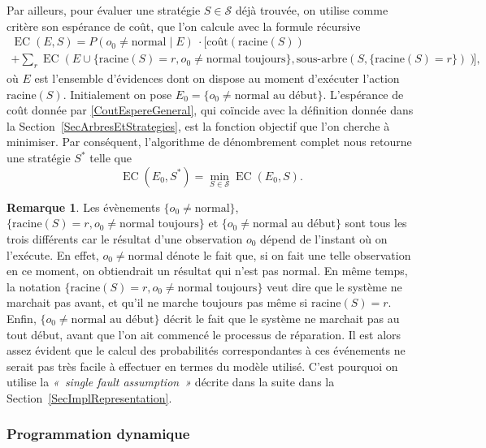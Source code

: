 \documentclass[a4paper,11pt]{article}
\theoremstyle{plain}
\theoremstyle{definition}
\newtheorem*{remk}{Remarque}
\DeclareMathOperator{\EC}{EC}
\begin{document}
Par ailleurs, pour évaluer une stratégie $S \in \mathcal S$ déjà trouvée, on utilise comme critère son espérance de coût, que l'on calcule avec la formule récursive
\begin{multline}
\label{CoutEspereGeneral}
\EC(E, S) = P(o_0 \neq \text{normal} \mid E) \: \cdot \Biggl[\text{coût}(\text{racine}(S)) \\ + \sum_{r} \EC(E \cup \{\text{racine}(S) = r, o_0 \neq \text{normal toujours}\}, \text{sous-arbre}(S, \{\text{racine}(S) = r\}))\Biggr],
\end{multline}
où $E$ est l'ensemble d'évidences dont on dispose au moment d'exécuter l'action $\text{racine}(S)$. Initialement on pose $E_0 = \{o_0 \neq \text{normal au début}\}$. L'espérance de coût donnée par \eqref{CoutEspereGeneral}, qui coïncide avec la définition donnée dans la Section~\ref{SecArbresEtStrategies}, est la fonction objectif que l'on cherche à minimiser. Par conséquent, l'algorithme de dénombrement complet nous retourne une stratégie $S^*$ telle que
\begin{equation}
\label{SolMainProblem}
\EC(E_0, S^*) = \min_{S \in \mathcal S} {\EC(E_0, S)}.
\end{equation}

\begin{remk}
Les évènements $\{o_0 \neq \text{normal}\}$, $\{\text{racine}(S) = r, o_0 \neq \text{normal toujours}\}$ et $\{o_0 \neq \text{normal }\allowbreak\text{au }\allowbreak\text{début}\}$ sont tous les trois différents car le résultat d'une observation $o_0$ dépend de l'instant où on l'exécute. En effet, $o_0 \neq \text{normal}$ dénote le fait que, si on fait une telle observation en ce moment, on obtiendrait un résultat qui n'est pas $\text{normal}$. En même temps, la notation $\{\text{racine}(S) = r, o_0 \neq \text{normal toujours}\}$ veut dire que le système ne marchait pas avant, et qu'il ne marche toujours pas même si $\text{racine}(S) = r$. Enfin, $\{o_0 \neq \text{normal au début}\}$ décrit le fait que le système ne marchait pas au tout début, avant que l'on ait commencé le processus de réparation. Il est alors assez évident que le calcul des probabilités correspondantes à ces événements ne serait pas très facile à effectuer en termes du modèle utilisé. C'est pourquoi on utilise la \emph{«~single fault assumption~»} décrite dans la suite dans la Section~\ref{SecImplRepresentation}.
\end{remk}

\subsubsection{Programmation dynamique}
\label{SecProgDyn}
\end{document}
